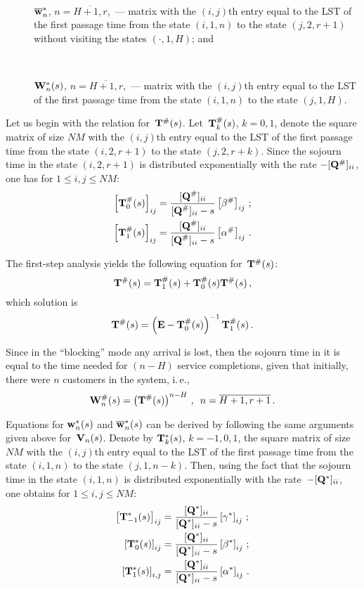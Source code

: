 \begin{multicols}{2}
\begin{description}
\item[\,] 
$\mathbf{\overline w}^*_n$, $n=\overline{H+1,r}$,~---
matrix with the $(i,j)${th} entry 
equal to the LST of the first passage time 
from the state $(i,1,n)$ to the state $(j,2,r+1)$
without visiting the states $(\cdot,1,H)$; and
\item[\,] 
$\mathbf{W}^*_n(s)$, $n=\overline{H+1,r}$,~---
matrix with the $(i,j)${th} entry 
equal to the LST of the first passage time 
from the state $(i,1,n)$ to the state $(j,1,H)$.
\end{description}

Let us begin with the relation for~$\mathbf{T}^{\#}(s)$. 
Let~$\mathbf{T}^{\#}_k(s)$, $k=0,1$, denote 
the square matrix of size $NM$ with 
the $(i,j)${th} entry 
equal to the LST of the first passage time 
from the state $(i,2,r+1)$ to the state $(j,2,r+k)$.
Since the sojourn time in the state $(i,2,r+1)$
is distributed exponentially with the rate $-[\mathbf{Q}^{\#}]_{ii}$, 
one has for $1 \le i,j \le NM$:
\begin{gather*}
\left[ \mathbf{T}^{\#}_0(s) \right]_{ij}
=
\displaystyle\frac{\displaystyle [\mathbf{Q}^{\#}]_{ii}\mathstrut}{\displaystyle [\mathbf{Q}^{\#}]_{ii} - s\mathstrut}
\left[\beta^{\#}\right]_{ij}  \,;
\\
\left[ \mathbf{T}^{\#}_1(s) \right]_{ij}
= \displaystyle\frac{\displaystyle [\mathbf{Q}^{\#}]_{ii} \mathstrut}{\displaystyle [\mathbf{Q}^{\#}]_{ii} - s\mathstrut}
\left[\alpha^{\#}\right]_{ij}  \,.
\end{gather*}

\noindent The first-step analysis yields the following 
equation for~$\mathbf{T}^{\#}(s)$:
$$
\mathbf{T}^{\#}(s)= \mathbf{T}^{\#}_1(s) + \mathbf{T}^{\#}_0(s) \mathbf{T}^{\#}(s)\,,
$$
which solution is
$$
\mathbf{T}^{\#}(s)= \left(\mathbf{E}-\mathbf{T}^{\#}_0(s)\right)^{-1} \mathbf{T}^{\#}_1(s)\,.
$$


Since in the ``blocking'' mode any arrival is lost, then the sojourn time in 
it is equal to the time needed for $(n-H)$ service completions,
given that initially, there were $n$ customers in the system, i.\,e.,
$$
\mathbf{W}^{\#}_n(s)= \left(\mathbf{T}^{\#}(s)\right)^{n-H}\,, \enskip
n=\overline{H+1,r+1}\,.
$$

Equations for $\mathbf{w}^*_n(s)$ and $\mathbf{\overline w}^*_n(s)$ can be 
derived by following the same arguments given above for~$\mathbf{V}_n(s)$. Denote by 
$\mathbf{T}^{*}_k(s)$, $k=-1,0,1$,  
the square matrix of size~$NM$ with 
the $(i,j)${th} entry 
equal to the LST of the first passage time 
from the state $(i,1,n)$ to the state $(j,1,n-k)$.
Then, using the fact that the sojourn time in the state $(i,1,n)$
is distributed exponentially with the rate~$-[\mathbf{Q}^{*}]_{ii}$, 
one obtains for $1 \le i,j \le NM$:
\begin{align*}
\left[ \mathbf{T}^{*}_{-1}(s) \right]_{ij}
&=
\displaystyle\frac{\displaystyle [\mathbf{Q}^{*}]_{ii}\mathstrut}{\displaystyle [\mathbf{Q}^{*}]_{ii} - s\mathstrut}
\left[\gamma^{*}\right]_{ij}\,;
\\
\left[ \mathbf{T}^{*}_0(s) \right]_{ij}
&=\displaystyle\frac{\displaystyle [\mathbf{Q}^{*}]_{ii}\mathstrut}{\displaystyle [\mathbf{Q}^{*}]_{ii} - s\mathstrut}
\left[\beta^{*}\right]_{ij}  \,;
\\
\left[ \mathbf{T}^{*}_1(s) \right]_{i,j}
&=
\displaystyle\frac{\displaystyle [\mathbf{Q}^{*}]_{ii} \mathstrut}{\displaystyle [\mathbf{Q}^{*}]_{ii} - s\mathstrut}
\left[\alpha^{*}\right]_{ij}   \,.
\end{align*}


\end{multicols}
